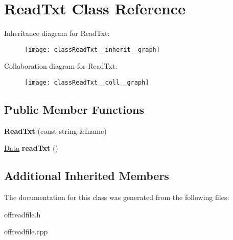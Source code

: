 \hypertarget{classReadTxt}{}\section{Read\+Txt Class Reference}
\label{classReadTxt}


Inheritance diagram for Read\+Txt\+:\nopagebreak
\begin{figure}[H]
\begin{center}
\leavevmode
\texttt{[image: classReadTxt\_\_inherit\_\_graph]}
\end{center}
\end{figure}


Collaboration diagram for Read\+Txt\+:\nopagebreak
\begin{figure}[H]
\begin{center}
\leavevmode
\texttt{[image: classReadTxt\_\_coll\_\_graph]}
\end{center}
\end{figure}
\subsection*{Public Member Functions}
\begin{DoxyCompactItemize}
\item 
\mbox{\label{classReadTxt_af66a9abde28671c08264b28c26646c2a}} 
{\bfseries Read\+Txt} (const string \&fname)
\item 
\mbox{\label{classReadTxt_adee9ad45d93fce109d24edaaa834a568}} 
\hyperlink{structData}{Data} {\bfseries read\+Txt} ()
\end{DoxyCompactItemize}
\subsection*{Additional Inherited Members}


The documentation for this class was generated from the following files\+:\begin{DoxyCompactItemize}
\item 
offreadfile.\+h\item 
offreadfile.\+cpp\end{DoxyCompactItemize}

